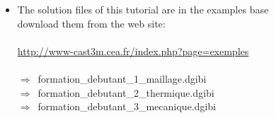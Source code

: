 \label{complements}

\begin{frame}{}
  \begin{itemize}
  \item {}
           {The solution files of this tutorial are in the examples base\\
            download them from the web site:}\\~\\
        \url{http://www-cast3m.cea.fr/index.php?page=exemples}\\~\\
  $\Rightarrow$~formation\_debutant\_1\_maillage.dgibi\\
  $\Rightarrow$~formation\_debutant\_2\_thermique.dgibi\\
  $\Rightarrow$~formation\_debutant\_3\_mecanique.dgibi
  \end{itemize}
\end{frame}
